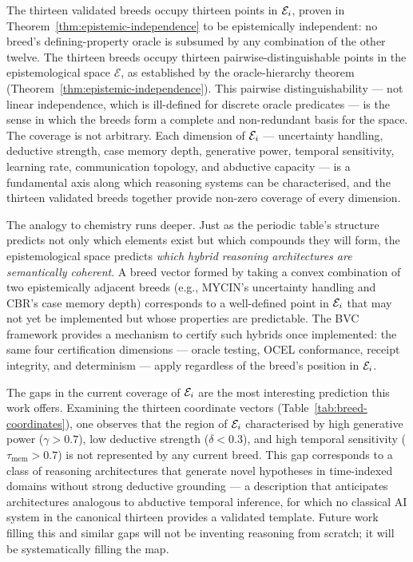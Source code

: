 The thirteen validated breeds occupy thirteen points in $\mathcal{E}_i$, proven in
Theorem~\ref{thm:epistemic-independence} to be epistemically independent: no breed's
defining-property oracle is subsumed by any combination of the other twelve. The thirteen
breeds occupy thirteen pairwise-distinguishable points in the epistemological space
$\mathcal{E}$, as established by the oracle-hierarchy theorem
(Theorem~\ref{thm:epistemic-independence}). This pairwise distinguishability --- not
linear independence, which is ill-defined for discrete oracle predicates --- is the sense
in which the breeds form a complete and non-redundant basis for the space. The coverage is
not arbitrary. Each dimension of $\mathcal{E}_i$ --- uncertainty handling, deductive strength, case
memory depth, generative power, temporal sensitivity, learning rate, communication
topology, and abductive capacity --- is a fundamental axis along which reasoning systems
can be characterised, and the thirteen validated breeds together provide non-zero coverage
of every dimension.

The analogy to chemistry runs deeper. Just as the periodic table's structure predicts not
only which elements exist but which compounds they will form, the epistemological space
predicts \emph{which hybrid reasoning architectures are semantically coherent}. A breed
vector formed by taking a convex combination of two epistemically adjacent breeds (e.g.,
MYCIN's uncertainty handling and CBR's case memory depth) corresponds to a well-defined
point in $\mathcal{E}_i$ that may not yet be implemented but whose properties are predictable. The
BVC framework provides a mechanism to certify such hybrids once implemented: the same four
certification dimensions — oracle testing, OCEL conformance, receipt integrity, and
determinism — apply regardless of the breed's position in $\mathcal{E}_i$.

The gaps in the current coverage of $\mathcal{E}_i$ are the most interesting prediction this work
offers. Examining the thirteen coordinate vectors
(Table~\ref{tab:breed-coordinates}), one observes that the region of $\mathcal{E}_i$ characterised
by high generative power ($\gamma > 0.7$), low deductive strength ($\delta < 0.3$),
and high temporal sensitivity ($\tau_{\mathrm{mem}} > 0.7$) is not represented by any
current breed. This gap corresponds to a class of reasoning architectures that generate
novel hypotheses in time-indexed domains without strong deductive grounding — a
description that anticipates architectures analogous to abductive temporal inference,
for which no classical AI system in the canonical thirteen provides a validated template.
Future work filling this and similar gaps will not be inventing reasoning from scratch;
it will be systematically filling the map.

